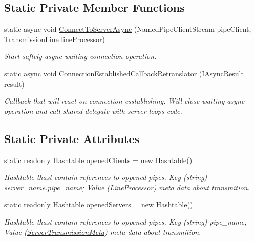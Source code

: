 \subsection*{Static Private Member Functions}
\begin{DoxyCompactItemize}
\item 
static async void \mbox{\hyperlink{class_pipes_provider_1_1_a_p_i_a5314727d43f5fafc8630dbc814cebeac}{Connect\+To\+Server\+Async}} (Named\+Pipe\+Client\+Stream pipe\+Client, \mbox{\hyperlink{class_pipes_provider_1_1_transmission_line}{Transmission\+Line}} line\+Processor)
\begin{DoxyCompactList}\small\item\em Start saftely async waiting connection operation. \end{DoxyCompactList}\item 
static async void \mbox{\hyperlink{class_pipes_provider_1_1_a_p_i_a0feeed2f76dc4292c3b85fdd054bd77e}{Connection\+Established\+Callback\+Retranslator}} (I\+Async\+Result result)
\begin{DoxyCompactList}\small\item\em Callback that will react on connection esstablishing. Will close waiting async operation and call shared delegate with server loop\textquotesingle{}s code. \end{DoxyCompactList}\end{DoxyCompactItemize}
\subsection*{Static Private Attributes}
\begin{DoxyCompactItemize}
\item 
static readonly Hashtable \mbox{\hyperlink{class_pipes_provider_1_1_a_p_i_a8efe588e9c6f7bf610310d9f6223a0f8}{opened\+Clients}} = new Hashtable()
\begin{DoxyCompactList}\small\item\em Hashtable thast contain references to oppened pipes. Key (string) server\+\_\+name.\+pipe\+\_\+name; Value (Line\+Processor) meta data about transmition. \end{DoxyCompactList}\item 
static readonly Hashtable \mbox{\hyperlink{class_pipes_provider_1_1_a_p_i_ae5d6ee8740cc704d7ac5fc619349b603}{opened\+Servers}} = new Hashtable()
\begin{DoxyCompactList}\small\item\em Hashtable thast contain references to oppened pipes. Key (string) pipe\+\_\+name; Value (\mbox{\hyperlink{class_pipes_provider_1_1_server_transmission_meta}{Server\+Transmission\+Meta}}) meta data about transmition. \end{DoxyCompactList}\end{DoxyCompactItemize}


